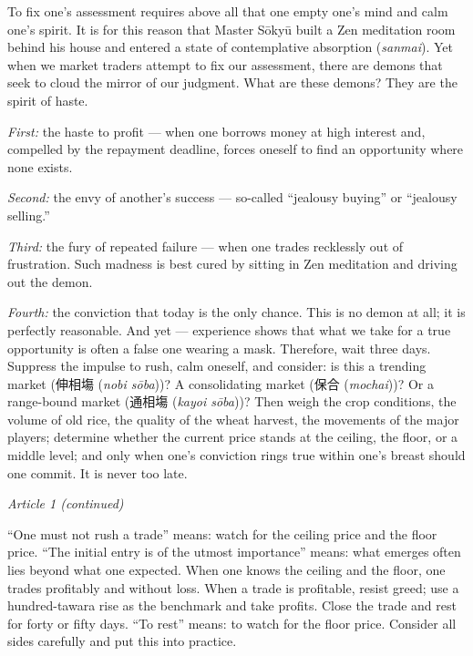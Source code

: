 \documentclass[10pt, openany]{book}
\newcommand{\jp}[1]{{\japanesefont #1}}
\newcommand{\jt}[2]{\jp{#1} (\textit{#2})}
\begin{document}
To fix one's assessment requires above all that one empty one's mind and
calm one's spirit. It is for this reason that Master S\=oky\=u built a
Zen meditation room behind his house and entered a state of contemplative
absorption (\textit{sanmai}). Yet when we market traders attempt to fix
our assessment, there are demons that seek to cloud the mirror of our
judgment. What are these demons? They are the spirit of haste.

\textit{First:} the haste to profit --- when one borrows money at high
interest and, compelled by the repayment deadline, forces oneself to find
an opportunity where none exists.

\textit{Second:} the envy of another's success --- so-called ``jealousy
buying'' or ``jealousy selling.''

\textit{Third:} the fury of repeated failure --- when one trades
recklessly out of frustration. Such madness is best cured by sitting in
Zen meditation and driving out the demon.

\textit{Fourth:} the conviction that today is the only chance. This is
no demon at all; it is perfectly reasonable. And yet --- experience shows
that what we take for a true opportunity is often a false one wearing a
mask. Therefore, wait three days. Suppress the impulse to rush, calm
oneself, and consider: is this a trending market (\jt{伸相塲}{nobi
s\=oba})? A consolidating market (\jt{保合}{mochai})? Or a range-bound
market (\jt{通相塲}{kayoi s\=oba})? Then weigh the crop conditions, the
volume of old rice, the quality of the wheat harvest, the movements of
the major players; determine whether the current price stands at the
ceiling, the floor, or a middle level; and only when one's conviction
rings true within one's breast should one commit. It is never too late.

\begin{sokyubox}
{\small\itshape\color{sokyubar} Article 1 (continued)}

\medskip
``One must not rush a trade'' means: watch for the ceiling price and the
floor price. ``The initial entry is of the utmost importance'' means:
what emerges often lies beyond what one expected. When one knows the
ceiling and the floor, one trades profitably and without loss. When a
trade is profitable, resist greed; use a hundred-tawara rise as the
benchmark and take profits. Close the trade and rest for forty or fifty
days. ``To rest'' means: to watch for the floor price. Consider all sides
carefully and put this into practice.
\end{sokyubox}
\end{document}
